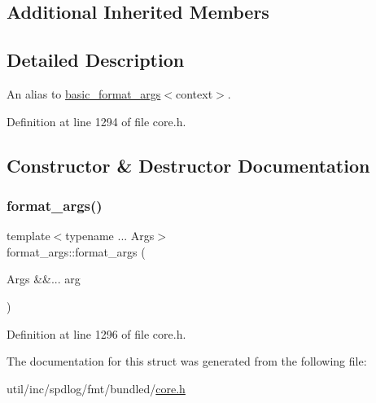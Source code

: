 \subsection*{Additional Inherited Members}


\subsection{Detailed Description}
An alias to {\ttfamily \hyperlink{classbasic__format__args}{basic\+\_\+format\+\_\+args}$<$context$>$}. 

Definition at line 1294 of file core.\+h.



\subsection{Constructor \& Destructor Documentation}
\mbox{\label{structformat__args_a42e4d5e4499e5164fa9a85424e2d80c3}} 
\subsubsection{\texorpdfstring{format\+\_\+args()}{format\_args()}}
{\footnotesize\ttfamily template$<$typename ... Args$>$ \\
format\+\_\+args\+::format\+\_\+args (\begin{DoxyParamCaption}\item[{Args \&\&...}]{arg }\end{DoxyParamCaption})\hspace{0.3cm}{\ttfamily [inline]}}



Definition at line 1296 of file core.\+h.



The documentation for this struct was generated from the following file\+:\begin{DoxyCompactItemize}
\item 
util/inc/spdlog/fmt/bundled/\hyperlink{core_8h}{core.\+h}\end{DoxyCompactItemize}
